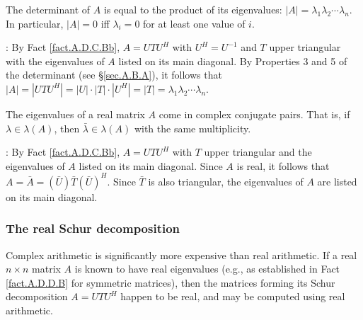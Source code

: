 \begin{fact} \label{fact.A.D.C.Be} The determinant of $A$ is equal to the product of its eigenvalues:
$|A|=\lambda_{1}\lambda_{2}\cdots\lambda_{n}$.  In particular, $|A|=0$
iff $\lambda_{i}=0$ for at least one value of $i$.
\end{fact}

\/: By Fact \ref{fact.A.D.C.Bb}, $A=UTU^{H}$ with
$U^{H}=U^{-1}$ and $T$ upper triangular with the eigenvalues of $A$
listed on its main diagonal.  By Properties 3 and 5 of the determinant
(see \S \ref{sec.A.B.A}), it follows that $|A|=|UTU^{H}|=|U|\cdot
|T|\cdot |U^{H}|= |T| =
\lambda_{1}\lambda_{2}\cdots\lambda_{n}$.  \endproof \vskip0.1in

\begin{fact} \label{fact.A.D.C.Bf} The eigenvalues of a real matrix $A$ come in complex conjugate pairs.
That is, if $\lambda\in \lambda(A)$, then $\bar\lambda \in \lambda(A)$ with the same multiplicity.
\end{fact}

\/: By Fact \ref{fact.A.D.C.Bb}, $A=UTU^{H}$ with $T$ upper triangular and the eigenvalues of $A$
listed on its main diagonal.  Since $A$ is real, it follows that $A=\bar A=(\bar U) \bar T (\bar U)^{H}$.  Since $\bar T$ is also triangular,
the eigenvalues of $A$ are listed on its main diagonal.  \endproof

\subsubsection{The real Schur decomposition} \label{sec.A.D.Ca}

Complex arithmetic is significantly more expensive than real arithmetic.  If a real $n\times n$ matrix $A$ is known
to have real eigenvalues (e.g., as established in Fact \ref{fact.A.D.D.B} for symmetric matrices), then the matrices forming its
Schur decomposition $A=UTU^H$ happen to be real, and may be computed using real arithmetic.  

